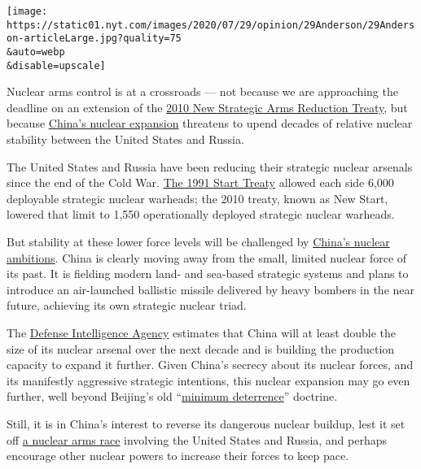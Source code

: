 \texttt{[image: https://static01.nyt.com/images/2020/07/29/opinion/29Anderson/29Anderson-articleLarge.jpg?quality=75\\\&auto=webp\\\&disable=upscale]}

Nuclear arms control is at a crossroads --- not because we are
approaching the deadline on an extension of the
\href{https://www.nytimes.com/topic/subject/new-start-treaty}{2010 New
Strategic Arms Reduction Treaty}, but because
\href{https://www.nytimes.com/2020/06/30/us/politics/trump-russia-china-nuclear.html}{China's
nuclear expansion} threatens to upend decades of relative nuclear
stability between the United States and Russia.

The United States and Russia have been reducing their strategic nuclear
arsenals since the end of the Cold War.
\href{https://www.nytimes.com/1991/05/03/opinion/start-treaty-finish-it-lose-it-richard-burt-was-chief-negotiator-strategic-arms.html}{The
1991 Start Treaty} allowed each side 6,000 deployable strategic nuclear
warheads; the 2010 treaty, known as New Start, lowered that limit to
1,550 operationally deployed strategic nuclear warheads.

But stability at these lower force levels will be challenged by
\href{https://www.nti.org/learn/countries/china/}{China's nuclear
ambitions}. China is clearly moving away from the small, limited nuclear
force of its past. It is fielding modern land- and sea-based strategic
systems and plans to introduce an air-launched ballistic missile
delivered by heavy bombers in the near future, achieving its own
strategic nuclear triad.

The
\href{https://www.dia.mil/News/Speeches-and-Testimonies/Article-View/Article/1859890/russian-and-chinese-nuclear-modernization-trends/}{Defense
Intelligence Agency} estimates that China will at least double the size
of its nuclear arsenal over the next decade and is building the
production capacity to expand it further. Given China's secrecy about
its nuclear forces, and its manifestly aggressive strategic intentions,
this nuclear expansion may go even further, well beyond Beijing's old
``\href{https://carnegieendowment.org/2016/06/30/china-s-nuclear-doctrine-debates-and-evolution-pub-63967}{minimum
deterrence}'' doctrine.

Still, it is in China's interest to reverse its dangerous nuclear
buildup, lest it set off
\href{https://www.nytimes.com/2019/08/08/world/europe/arms-race-russia-china.html}{a
nuclear arms race} involving the United States and Russia, and perhaps
encourage other nuclear powers to increase their forces to keep pace.

